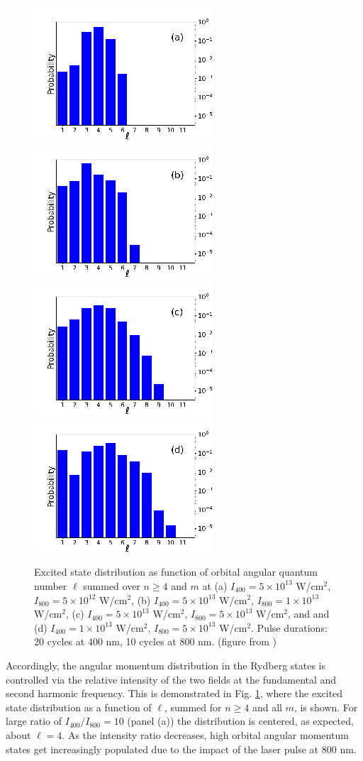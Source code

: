 \begin{figure}[!ht]
\centering
\includegraphics[width=0.24\columnwidth]{figs/Rydberg/Gebre-bicircular-Fig3a.png}
\includegraphics[width=0.24\columnwidth]{figs/Rydberg/Gebre-bicircular-Fig3b.png}
\includegraphics[width=0.24\columnwidth]{figs/Rydberg/Gebre-bicircular-Fig3c.png}
\includegraphics[width=0.24\columnwidth]{figs/Rydberg/Gebre-bicircular-Fig3d.png}
\caption{\label{fig:l-distribution}
Excited state distribution as function of orbital angular quantum number $\ell$ summed over $n \ge 4$ and $m$ at 
(a) $I_{400} = 5 \times 10^{13}$ W/cm$^2$, $I_{800} = 5 \times 10^{12}$ W/cm$^2$, 
(b) $I_{400} = 5 \times 10^{13}$ W/cm$^2$, $I_{800} = 1 \times 10^{13}$ W/cm$^2$, 
(c) $I_{400} = 5 \times 10^{13}$ W/cm$^2$, $I_{800} = 5 \times 10^{13}$ W/cm$^2$, and
and (d) $I_{400} = 1 \times 10^{13}$ W/cm$^2$, $I_{800} = 5 \times 10^{13}$ W/cm$^2$. Pulse durations: 20 cycles at 400 nm, 10 cycles at 800 nm. (figure from \cite{venzke2020_ryd})
}
\end{figure}

Accordingly, the angular momentum distribution in the Rydberg states is controlled via the relative intensity of the two fields at the fundamental and second harmonic frequency. This is demonstrated in Fig. \ref{fig:l-distribution}, where the excited state distribution as a function of $\ell$, summed for $n \ge 4$ and all $m$, is shown. For large ratio of $I_{400}/I_{800} = 10$ (panel (a)) the distribution is centered, as expected, about $\ell = 4$. As the intensity ratio decreases, high orbital angular momentum states get increasingly populated due to the impact of the laser pulse at 800 nm. 

